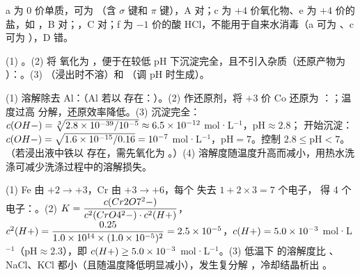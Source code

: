 \begin{jiexilist}
\item {}a 为 0 价单质，可为 （含 $\sigma$ 键和 $\pi$ 键），A 对；c 为 $+4$ 价氧化物、e 为 $+4$ 价的盐，如 ，B 对；，C 对；f 为 $-1$ 价的酸 HCl，不能用于自来水消毒（a 可为 、c 可为 ），D 错。
\item (1) 。(2) 将  氧化为 ，便于在较低 pH 下沉淀完全，且不引入杂质（还原产物为 ）：。(3) （浸出时不溶）和 （调 pH 时生成）。
\item (1) 溶解除去 Al：（Al 若以  存在：）。(2) 作还原剂，将 $+3$ 价 Co 还原为 ：；温度过高  分解，还原效率降低。(3)  沉淀完全：$c(OH-)=\sqrt[3]{2.8\times10^{-39}/10^{-5}}\approx6.5\times10^{-12}$ mol·L$^{-1}$，pH$\approx2.8$； 开始沉淀：$c(OH-)=\sqrt{1.6\times10^{-15}/0.16}=10^{-7}$ mol·L$^{-1}$，pH$=7$。控制 $2.8\le$pH$<7$。（若浸出液中铁以  存在，需先氧化为 。）(4)  溶解度随温度升高而减小，用热水洗涤可减少洗涤过程中的溶解损失。
\item (1) Fe 由 $+2\to+3$，Cr 由 $+3\to+6$，每个  失去 $1+2\times3=7$ 个电子， 得 4 个电子：。(2) $K=\dfrac{c(Cr2O7^2-)}{c^2(CrO4^2-)\cdot c^2(H+)}$，$c^2(H+)=\dfrac{0.25}{1.0\times10^{14}\times(1.0\times10^{-5})^2}=2.5\times10^{-5}$，$c(H+)=5.0\times10^{-3}$ mol·L$^{-1}$（pH$\approx2.3$），即 $c(H+)\ge5.0\times10^{-3}$ mol·L$^{-1}$。(3) 低温下  的溶解度比 、NaCl、KCl 都小（且随温度降低明显减小），发生复分解 ，冷却结晶析出 。
\end{jiexilist}
